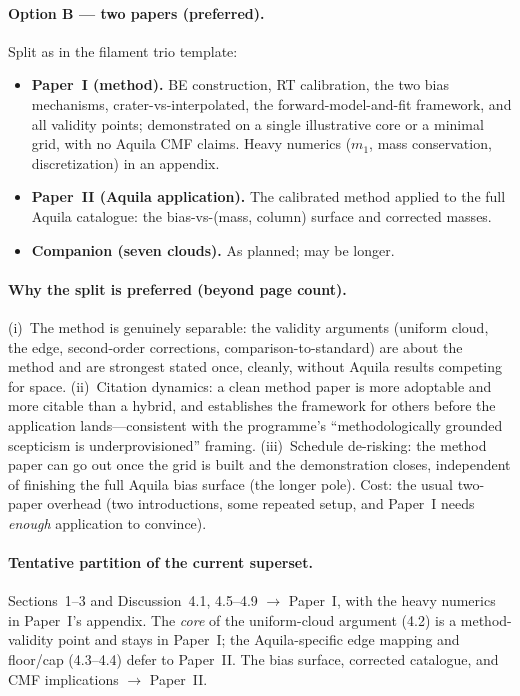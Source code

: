 \documentclass[11pt,a4paper]{article}
\begin{document}
\paragraph{Option B --- two papers (preferred).} Split as in the filament
trio template:
\begin{itemize}
  \item \textbf{Paper~I (method).} BE construction, RT calibration, the two
        bias mechanisms, crater-vs-interpolated, the forward-model-and-fit
        framework, and all validity points; demonstrated on a single
        illustrative core or a minimal grid, with no Aquila CMF claims.
        Heavy numerics ($m_{1}$, mass conservation, discretization) in an
        appendix.
  \item \textbf{Paper~II (Aquila application).} The calibrated method
        applied to the full Aquila catalogue: the bias-vs-(mass, column)
        surface and corrected masses.
  \item \textbf{Companion (seven clouds).} As planned; may be longer.
\end{itemize}

\paragraph{Why the split is preferred (beyond page count).}
(i)~The method is genuinely separable: the validity arguments (uniform
cloud, the edge, second-order corrections, comparison-to-standard) are about
the method and are strongest stated once, cleanly, without Aquila results
competing for space. (ii)~Citation dynamics: a clean method paper is more
adoptable and more citable than a hybrid, and establishes the framework for
others before the application lands---consistent with the programme's
``methodologically grounded scepticism is underprovisioned'' framing.
(iii)~Schedule de-risking: the method paper can go out once the grid is
built and the demonstration closes, independent of finishing the full Aquila
bias surface (the longer pole). Cost: the usual two-paper overhead (two
introductions, some repeated setup, and Paper~I needs \emph{enough}
application to convince).

\paragraph{Tentative partition of the current superset.}
Sections~1--3 and Discussion~4.1, 4.5--4.9 $\rightarrow$ Paper~I, with the
heavy numerics in Paper~I's appendix. The \emph{core} of the uniform-cloud
argument (4.2) is a method-validity point and stays in Paper~I; the
Aquila-specific edge mapping and floor/cap (4.3--4.4) defer to Paper~II.
The bias surface, corrected catalogue, and CMF implications $\rightarrow$
Paper~II. 
\end{document}
